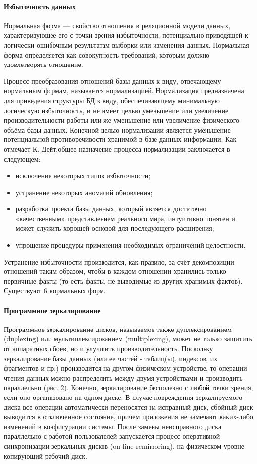 \paragraph{Избыточность данных} 
Нормальная форма — свойство отношения в реляционной модели данных, характеризующее его с точки зрения избыточности, потенциально приводящей к логически ошибочным результатам выборки или изменения данных. Нормальная форма определяется как совокупность требований, которым должно удовлетворять отношение.

Процесс преобразования отношений базы данных к виду, отвечающему нормальным формам, называется нормализацией. Нормализация предназначена для приведения структуры БД к виду, обеспечивающему минимальную логическую избыточность, и не имеет целью уменьшение или увеличение производительности работы или же уменьшение или увеличение физического объёма базы данных. Конечной целью нормализации является уменьшение потенциальной противоречивости хранимой в базе данных информации. Как отмечает К. Дейт,общее назначение процесса нормализации заключается в следующем:
\begin{itemize}
    \item исключение некоторых типов избыточности;
    \item устранение некоторых аномалий обновления;
    \item разработка проекта базы данных, который является достаточно «качественным» представлением реального мира, интуитивно понятен и может служить хорошей основой для последующего расширения;
    \item упрощение процедуры применения необходимых ограничений целостности.
\end{itemize}

Устранение избыточности производится, как правило, за счёт декомпозиции отношений таким образом, чтобы в каждом отношении хранились только первичные факты (то есть факты, не выводимые из других хранимых фактов). \\
Существуют 6 нормальных форм. \\
\paragraph{Программное зеркалирование} 
Программное зеркалирование дисков, называемое также дуплексированием (duрlexing) или мультиплексированием (multiplexing), может не только защитить от аппаратных сбоев, но и улучшить производительность. Поскольку зеркалирование базы данных (или ее частей - таблиц(ы), индексов, их фрагментов и пр.) производится на другом физическом устройстве, то операции чтения данных можно распределить между двумя устройствами и производить параллельно (рис. 2). Конечно, зеркалирование бесполезно с любой точки зрения, если оно организовано на одном диске.
В случае повреждения зеркалируемого диска все операции автоматически переносятся на исправный диск, сбойный диск выводится в отключенное состояние, причем приложения не замечают каких-либо изменений в конфигурации системы.
После замены неисправного диска параллельно с работой пользователей запускается процесс оперативной синхронизации зеркальных дисков (on-line remirroring), на физическом уровне копирующий рабочий диск. \\
